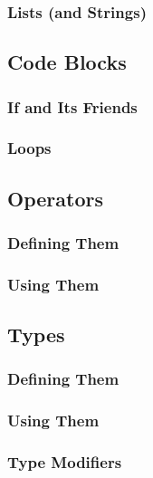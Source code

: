 \documentclass{article}
\begin{document}
\subsubsection{Lists (and Strings)}



\subsection{Code Blocks}
\subsubsection{If and Its Friends}

\subsubsection{Loops}

\subsection{Operators}
\subsubsection{Defining Them}

\subsubsection{Using Them}

\subsection{Types}
\subsubsection{Defining Them}

\subsubsection{Using Them}

\subsubsection{Type Modifiers}
\end{document}
